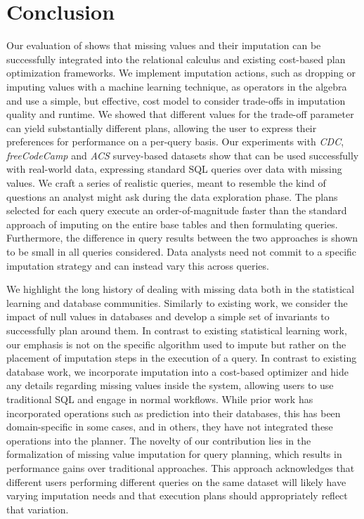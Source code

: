 \section{Conclusion}
Our evaluation of \ProjectName{} shows that missing values and their imputation can be successfully integrated into the relational calculus and
existing cost-based plan optimization frameworks. We implement imputation actions, such as dropping or imputing values with a machine
learning technique, as operators in the algebra and use a simple, but effective, cost model to consider trade-offs in 
imputation quality and runtime. We showed that different values for the trade-off parameter can yield substantially
different plans, allowing the user to express their preferences for performance on a per-query basis.
Our experiments with \textit{CDC}, \textit{freeCodeCamp} and \textit{ACS} survey-based datasets
show that \ProjectName{} can be used successfully with real-world data, expressing standard SQL queries over data with missing values. 
We craft a series of realistic queries, meant to resemble the kind of questions an analyst might ask during
the data exploration phase. The plans selected for each query execute an order-of-magnitude faster than
 the standard approach of imputing on the entire base tables and
then formulating queries. Furthermore, the difference in query results between the two approaches is
shown to be small in all queries considered. Data analysts need not commit to a specific imputation strategy and can instead
vary this across queries.

We highlight the long history of dealing with missing data both in the statistical learning and database communities.
Similarly to existing work, we consider the impact of null values in databases and develop a simple set of invariants to 
successfully plan around them. In contrast to existing statistical learning work, our emphasis is not on the specific algorithm
used to impute but rather on the placement of imputation steps in the execution of a query. In contrast to existing database work,
we incorporate imputation into a cost-based optimizer and hide any details
regarding missing values inside the system, allowing users to use traditional SQL and engage in normal workflows.
While prior work has incorporated operations such as prediction into their databases, this has been domain-specific
in some cases, and in others, they have not integrated these operations into the planner. The novelty
of our contribution lies in the formalization of missing value imputation for query planning, which results in performance
gains over traditional approaches. This approach acknowledges that different users performing different queries on the same
dataset will likely have varying imputation needs and that execution plans should appropriately reflect that variation.

